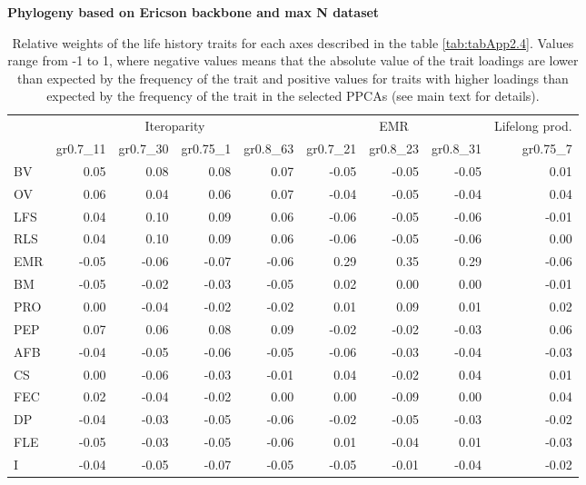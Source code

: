 \clearpage%
\begin{landscape}
\begin{table}
\center
\caption[LHT relative importance of the alternative axes]{
Relative weights of the life history traits for each axes described in the
table \ref{tab:tabApp2.4}. Values range from -1 to 1, where negative values
means that the absolute value of the trait loadings are lower than expected by
the frequency of the trait and positive values for traits with higher loadings
than expected by the frequency of the trait in the selected PPCAs (see main
text for details).
}
\label{tab:tabApp2.6}
\begin{footnotesize}

\textbf{Phylogeny based on Ericson backbone and max N dataset}

\begin{tabular}{@{}l|rrrr|rrr|r@{}}
\toprule
 & \multicolumn{4}{c|}{Iteroparity} & \multicolumn{3}{c|}{EMR} & \multicolumn{1}{c}{Lifelong prod.}\\
 & gr0.7\_11 & gr0.7\_30 & gr0.75\_1 & gr0.8\_63 & gr0.7\_21 & gr0.8\_23 & gr0.8\_31 & gr0.75\_7\\
\midrule
BV & 0.05 & 0.08 & 0.08 & 0.07 & -0.05 & -0.05 & -0.05 & 0.01\\
OV & 0.06 & 0.04 & 0.06 & 0.07 & -0.04 & -0.05 & -0.04 & 0.04\\
LFS & 0.04 & 0.10 & 0.09 & 0.06 & -0.06 & -0.05 & -0.06 & -0.01\\
RLS & 0.04 & 0.10 & 0.09 & 0.06 & -0.06 & -0.05 & -0.06 & 0.00\\
EMR & -0.05 & -0.06 & -0.07 & -0.06 & 0.29 & 0.35 & 0.29 & -0.06\\
BM & -0.05 & -0.02 & -0.03 & -0.05 & 0.02 & 0.00 & 0.00 & -0.01\\
PRO & 0.00 & -0.04 & -0.02 & -0.02 & 0.01 & 0.09 & 0.01 & 0.02\\
PEP & 0.07 & 0.06 & 0.08 & 0.09 & -0.02 & -0.02 & -0.03 & 0.06\\
AFB & -0.04 & -0.05 & -0.06 & -0.05 & -0.06 & -0.03 & -0.04 & -0.03\\
CS & 0.00 & -0.06 & -0.03 & -0.01 & 0.04 & -0.02 & 0.04 & 0.01\\
FEC & 0.02 & -0.04 & -0.02 & 0.00 & 0.00 & -0.09 & 0.00 & 0.04\\
DP & -0.04 & -0.03 & -0.05 & -0.06 & -0.02 & -0.05 & -0.03 & -0.02\\
FLE & -0.05 & -0.03 & -0.05 & -0.06 & 0.01 & -0.04 & 0.01 & -0.03\\
I & -0.04 & -0.05 & -0.07 & -0.05 & -0.05 & -0.01 & -0.04 & -0.02\\
\bottomrule
\end{tabular}


\end{footnotesize}
\end{table}
\end{landscape}
